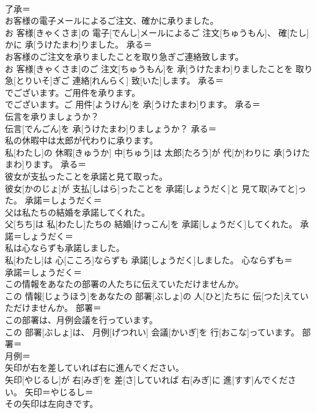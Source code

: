 \documentclass[8pt]{extreport}
\begin{document}
\begin{CJK}{UTF8}{min}
\\	了承＝ 
\\	お客様の電子メールによるご注文、確かに承りました。	
\\	お 客様[きゃくさま]の 電子[でんし]メールによるご 注文[ちゅうもん]、 確[たし]かに 承[うけたまわ]りました。	承る＝ 
\\	お客様のご注文を承りましたことを取り急ぎご連絡致します。	
\\	お 客様[きゃくさま]のご 注文[ちゅうもん]を 承[うけたまわ]りましたことを 取り急[とりいそ]ぎご 連絡[れんらく] 致[いた]します。	承る＝ 
\\	でございます。ご用件を承ります。	
\\	でございます。ご 用件[ようけん]を 承[うけたまわ]ります。	承る＝ 
\\	伝言を承りましょうか？	
\\	伝言[でんごん]を 承[うけたまわ]りましょうか？	承る＝ 
\\	私の休暇中は太郎が代わりに承ります。	
\\	私[わたし]の 休暇[きゅうか] 中[ちゅう]は 太郎[たろう]が 代[か]わりに 承[うけたまわ]ります。	承る＝ 
\\	彼女が支払ったことを承諾と見て取った。	
\\	彼女[かのじょ]が 支払[しはら]ったことを 承諾[しょうだく]と 見て取[みてと]った。	承諾＝しょうだく＝ 
\\	父は私たちの結婚を承諾してくれた。	
\\	父[ちち]は 私[わたし]たちの 結婚[けっこん]を 承諾[しょうだく]してくれた。	承諾＝しょうだく＝ 
\\	私は心ならずも承諾しました。	
\\	私[わたし]は 心[こころ]ならずも 承諾[しょうだく]しました。	心ならずも＝ 
\\	承諾＝しょうだく＝ 
\\	この情報をあなたの部署の人たちに伝えていただけませんか。	
\\	この 情報[じょうほう]をあなたの 部署[ぶしょ]の 人[ひと]たちに 伝[つた]えていただけませんか。	部署＝ 
\\	この部署は、月例会議を行っています。	
\\	この 部署[ぶしょ]は、 月例[げつれい] 会議[かいぎ]を 行[おこな]っています。	部署＝ 
\\	月例＝ 
\\	矢印が右を差していれば右に進んでください。	
\\	矢印[やじるし]が 右[みぎ]を 差[さ]していれば 右[みぎ]に 進[すす]んでください。	矢印＝やじるし＝ 
\\	その矢印は左向きです。	

\end{CJK}
\end{document}
